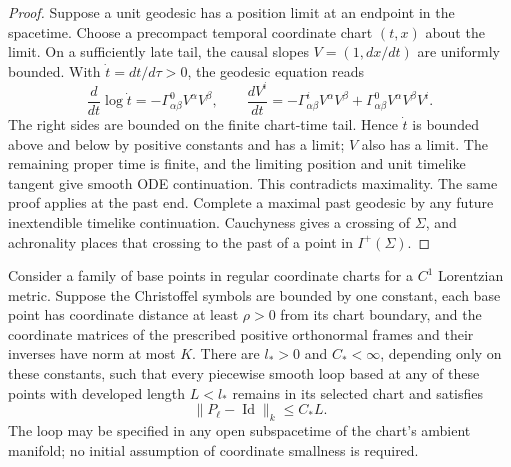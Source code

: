 \begin{proof}
Suppose a unit geodesic has a position limit at an endpoint in the
spacetime. Choose a precompact temporal coordinate chart $(t,x)$
about the limit. On a sufficiently late tail, the causal slopes
$V=(1,dx/dt)$ are uniformly bounded. With $\dot t=dt/d\tau>0$,
the geodesic equation reads
\begin{equation}\label{test:time-geodesic}
 \frac{d}{dt}\log\dot t
   =-\Gamma^0_{\alpha\beta}V^\alpha V^\beta,
 \qquad
 \frac{dV^i}{dt}
   =-\Gamma^i_{\alpha\beta}V^\alpha V^\beta
       +\Gamma^0_{\alpha\beta}V^\alpha V^\beta V^i.
\end{equation}
The right sides are bounded on the finite chart-time tail. Hence
$\dot t$ is bounded above and below by positive constants and has
a limit; $V$ also has a limit. The remaining proper time is finite,
and the limiting position and unit timelike tangent give smooth ODE
continuation. This contradicts maximality. The same proof applies at
the past end. Complete a maximal past geodesic by any future
inextendible timelike continuation. Cauchyness gives a crossing of
$\Sigma$, and achronality places that crossing to the past of a
point in $I^+(\Sigma)$.
\end{proof}

\begin{lemma}
\label{test:loop-bootstrap}
Consider a family of base points in regular coordinate charts for a
$C^1$ Lorentzian metric. Suppose the Christoffel symbols are bounded
by one constant, each base point has coordinate distance at least
$\rho>0$ from its chart boundary, and the coordinate matrices of
the prescribed positive orthonormal frames and their inverses have
norm at most $K$. There are $l_*>0$ and $C_*<\infty$, depending
only on these constants, such that every piecewise smooth loop based
at any of these points with developed length $L<l_*$ remains in its
selected chart and satisfies
\begin{equation}\label{test:local-loop-bound}
 \lVert P_\ell-\operatorname{Id}\rVert_k\le C_*L.
\end{equation}
The loop may be specified in any open subspacetime of the chart's
ambient manifold; no initial assumption of coordinate smallness is
required.
\end{lemma}


